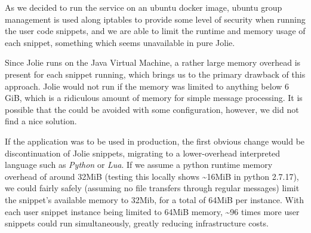 As we decided to run the service on an ubuntu docker image, ubuntu group management is used along iptables to provide some level of security when running the user code snippets, and we are able to limit the runtime and memory usage of each snippet, something which seems unavailable in pure Jolie.

Since Jolie runs on the Java Virtual Machine, a rather large memory overhead is present for each snippet running, which brings us to the primary drawback of this approach.
Jolie would not run if the memory was limited to anything below 6 GiB, which is a ridiculous amount of memory for simple message processing.
It is possible that the could be avoided with some configuration, however, we did not find a nice solution.


\bigskip

If the application was to be used in production, the first obvious change would be discontinuation of Jolie snippets, migrating to a lower-overhead interpreted language such as \textit{Python} or \textit{Lua}.
If we assume a python runtime memory overhead of around 32MiB (testing this locally shows \textasciitilde 16MiB in python 2.7.17), we could fairly safely (assuming no file transfers through regular messages) limit the snippet's available memory to 32Mib, for a total of 64MiB per instance. 
With each user snippet instance being limited to 64MiB memory, \textasciitilde 96 times more user snippets could run simultaneously, greatly reducing infrastructure costs.
